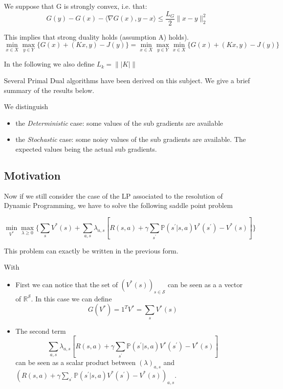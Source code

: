 \documentclass[12pt,reqno]{amsart}
\numberwithin{equation}{section}
\begin{document}
We suppose that G is strongly convex, i.e. that:
$$
G(y) - G(x) - \langle \nabla G(x),y - x\rangle \leq \dfrac{L_{G}}{2} \lVert x - y \rVert_{2}^{2}
$$

This implies that strong duality holds (assumption A) holds).
$$
\min_{x \in X}\max_{y \in Y} \{ G(x) + (Kx,y) - J(y)\} = \min_{x \in X}\max_{y \in Y}\min_{x \in X} \{ G(x) + (Kx,y) - J(y)\}
$$


In the following we also define $\boxed{ L_{k} = \lVert| K |\rVert }$

Several Primal Dual algorithms have been derived on this subject.
We give a brief summary of the results below.

We distinguish 

\begin{itemize}
\item the \emph{Deterministic} case: some values of the sub gradients are available
\item the \emph{Stochastic} case:  some noisy values of the sub gradients are available. 
The expected values being the actual sub gradients.
\end{itemize}

\subsection{Motivation}

Now if we still consider the case of the LP associated to the resolution of Dynamic Programming,
we have to solve the following saddle point problem

$$
\min_{V^{*}}\max_{\lambda \geq 0}\{ \sum_{s} V^{*}(s) + \sum_{a,s}\lambda_{a,s}[R(s,a) + \gamma \sum_{s^{'}}\mathbb{P}(s^{'}| s,a )V^{*}(s^{'}) - V^{*}(s)] \}
$$

This problem can exactly be written in the previous form.


With 

\begin{itemize}
\item First we can notice that the set of $(V^{*}(s))_{s \in \mathcal{S}}$ 
can be seen as a a vector of $\mathbb{R}^{\mathcal{S}}$. In this case we can define
$$G(V^{*}) = 1^{T}V^{*} = \sum_{s} V^{*}(s)$$
\item The second term 
$$
\sum_{a,s}\lambda_{a,s}[R(s,a) + \gamma \sum_{s^{'}}\mathbb{P}(s^{'}| s,a )V^{*}(s^{'}) - V^{*}(s)]
$$
can be seen as a scalar product between $(\lambda)_{a,s}$ and $(R(s,a) + \gamma \sum_{s^{'}}\mathbb{P}(s^{'}| s,a )V^{*}(s^{'}) - V^{*}(s))_{a,s}$.

\end{itemize}
\end{document}
